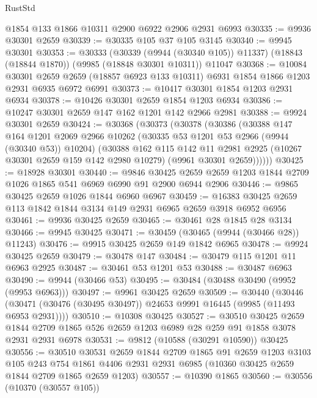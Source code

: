 \begin{lexlean}{RustStd}
\begin{coremodule}
    @1854
    @133
    @1866
    @10311
    @2900
    @6922
    @2906
    @2931
    @6993
@30335 := @9936 @30301 @2659
@30339 := @30335 @105 @37 @105 @3145
@30340 := @9945 @30301
@30353 := @30333
    (@30339 (@9944 (@30340 @105)) @11337)
    (@18843 (@18844 @1870))
    (@9985 (@18848 @30301 @10311))
    @11047
@30368 := @10084
    @30301
    @2659
    @2659
    (@18857 @6923 @133 @10311)
    @6931
    @1854
    @1866
    @1203
    @2931
    @6935
    @6972
    @6991
@30373 := @10417 @30301 @1854 @1203 @2931 @6934
@30378 := @10426 @30301 @2659 @1854 @1203 @6934
@30386 := @10247 @30301 @2659 @147 @162 @1201 @142 @2966 @2981
@30388 := @9924 @30301 @2659
@30424 := @30368
    (@30373
      (@30378
        (@30386
          (@30388
            @147
            @164
            @1201
            @2069
            @2966
            @10262
            (@30335 @53 @1201 @53 @2966 (@9944 (@30340 @53)) @10204)
            (@30388
              @162
              @115
              @142
              @11
              @2981
              @2925
              (@10267 @30301 @2659 @159 @142 @2980 @10279)
              (@9961 @30301 @2659))))))
@30425 := @18928 @30301
@30440 := @9846
    @30425
    @2659
    @2659
    @1203
    @1844
    @2709
    @1026
    @1865
    @541
    @6969
    @6990
    @91
    @2900
    @6944
    @2906
@30446 := @9865 @30425 @2659 @1026 @1844 @6960 @6967
@30459 := @16383 @30425 @2659 @113 @1842 @1844 @3134 @149 @2931 @6965 @2659 @3918 @6952 @6956
@30461 := @9936 @30425 @2659
@30465 := @30461 @28 @1845 @28 @3134
@30466 := @9945 @30425
@30471 := @30459 (@30465 (@9944 (@30466 @28)) @11243)
@30476 := @9915 @30425 @2659 @149 @1842 @6965
@30478 := @9924 @30425 @2659
@30479 := @30478 @147
@30484 := @30479 @115 @1201 @11 @6963 @2925
@30487 := @30461 @53 @1201 @53
@30488 := @30487 @6963
@30490 := @9944 (@30466 @53)
@30495 := @30484 (@30488 @30490 (@9952 (@9953 @6963)))
@30497 := @9961 @30425 @2659
@30509 := @30440
    (@30446 (@30471 (@30476 (@30495 @30497)) @24653 @9991 @16445 (@9985 (@11493 @6953 @2931))))
@30510 := @10308 @30425
@30527 := @30510
    @30425
    @2659
    @1844
    @2709
    @1865
    @526
    @2659
    @1203
    @6989
    @28
    @259
    @91
    @1858
    @3078
    @2931
    @2931
    @6978
@30531 := @9812 (@10588 (@30291 @10590)) @30425
@30556 := @30510
    @30531
    @2659
    @1844
    @2709
    @1865
    @91
    @2659
    @1203
    @3103
    @105
    @243
    @754
    @1861
    @4406
    @2931
    @2931
    @6985
    (@10360 @30425 @2659 @1844 @2709 @1865 @2659 @1203)
@30557 := @10390 @1865
@30560 := @30556 (@10370 (@30557 @105))

\end{coremodule}
\end{lexlean}
